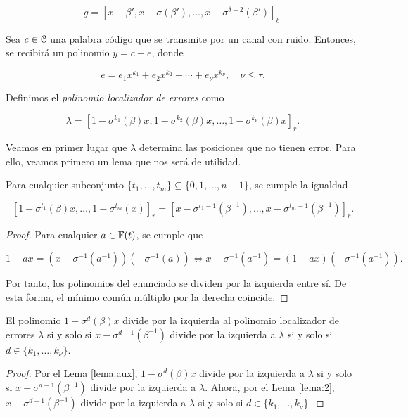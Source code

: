 $$ g = \left[x - \beta',x - \sigma(\beta'),\dots,x - \sigma^{\delta - 2}(\beta')\right]_\ell.$$

Sea $c \in \mathcal C$ una palabra código que se transmite por un canal con ruido. Entonces, se recibirá un polinomio $y = c + e$, donde

$$e = e_1x^{k_1} + e_2x^{k_2} + \cdots + e_\nu x^{k_\nu}, \quad \nu \leq \tau.$$

Definimos el \emph{polinomio localizador de errores} como

$$ \lambda = \left[ 1 - \sigma^{k_1}(\beta)x, 1 - \sigma^{k_2}(\beta)x, \dots, 1 - \sigma^{k_\nu}(\beta)x   \right]_r.$$


Veamos en primer lugar que $\lambda$ determina las posiciones que no tienen error. Para ello, veamos primero un lema que nos será de utilidad.


\begin{lema}\label{lema:aux}
Para cualquier subconjunto $\{t_1,\dots,t_m\} \subseteq \{0,1,\dots,n-1\}$, se cumple la igualdad

\begin{equation}
\left[ 1 - \sigma^{t_1}(\beta)x,\dots, 1-\sigma^{t_m}(x) \right]_r = \left[ x - \sigma^{t_1 - 1}(\beta^{-1}), \dots, x - \sigma^{t_m - 1}(\beta^{-1}) \right]_r.
\end{equation}

\end{lema}

\begin{proof}
Para cualquier $a \in \mathbb{F}(t)$, se cumple que

$$1 - ax = (x - \sigma^{-1}(a^{-1}))(-\sigma^{-1}(a)) \Leftrightarrow  x - \sigma^{-1}(a^{-1}) = (1 - ax)(-\sigma^{-1}(a^{-1})). $$

Por tanto, los polinomios del enunciado se dividen por la izquierda entre sí. De esta forma, el mínimo común múltiplo por la derecha coincide.

\end{proof}


\begin{proposicion}
El polinomio $1 - \sigma^d(\beta)x$ divide por la izquierda al polinomio localizador de errores $\lambda$ si y solo si $x - \sigma^{d-1}(\beta^{-1})$ divide por la izquierda a $\lambda$ si y solo si $d \in \{k_1,\dots, k_\nu\}$.
\end{proposicion}

\begin{proof}
Por el Lema \ref{lema:aux},  $1 - \sigma^d(\beta)x$ divide por la izquierda a $\lambda$ si y solo si $x - \sigma^{d-1}(\beta^{-1})$ divide por la izquierda a $\lambda$. Ahora, por el Lema \ref{lema:2}, $x - \sigma^{d-1}(\beta^{-1})$ divide por la izquierda a $\lambda$ si y solo si $d \in \{k_1,\dots,k_\nu\}$.
\end{proof}

